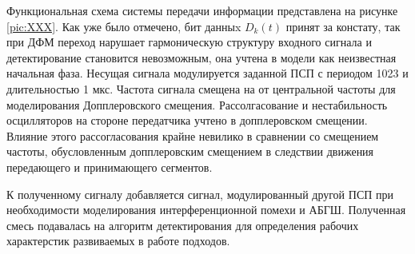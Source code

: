 Функциональная схема системы передачи информации представлена на рисунке \ref{pic:XXX}. Как уже было отмечено, бит данныx ${D_k(t)}$
принят за констату, так при ДФМ переход нарушает гармоническую структуру входного сигнала и детектирование становится невозможным,
она учтена в модели как неизвестная начальная фаза. Несущая сигнала модулируется заданной ПСП с периодом 1023 и длительностью 1 мкс.
Частота сигнала смещена на от центральной частоты для моделирования Допплеровского смещения. Рассолгасование и нестабильность
осцилляторов на стороне передатчика учтено в допплеровском смещении. Влияние этого рассогласования крайне невилико в сравнении
со смещением частоты, обусловленным допплеровским смещением в следствии движения передающего и принимающего сегментов.

К полученному сигналу добавляется
сигнал, модулированный другой ПСП при необходимости моделирования интерференционной помехи и АБГШ. Полученная смесь подавалась
на алгоритм детектирования для определения рабочих характерстик развиваемых в работе подходов.
